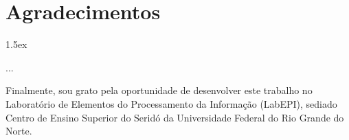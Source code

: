 
\chapter*{Agradecimentos}
\thispagestyle{empty}

\begin{trivlist}  \itemsep 1.5ex

\item ...

\item Finalmente, sou grato pela oportunidade de desenvolver este trabalho no
Laboratório de Elementos do Processamento da Informação (LabEPI), sediado
Centro de Ensino Superior do Seridó da Universidade Federal do Rio Grande do
Norte.

\end{trivlist}

